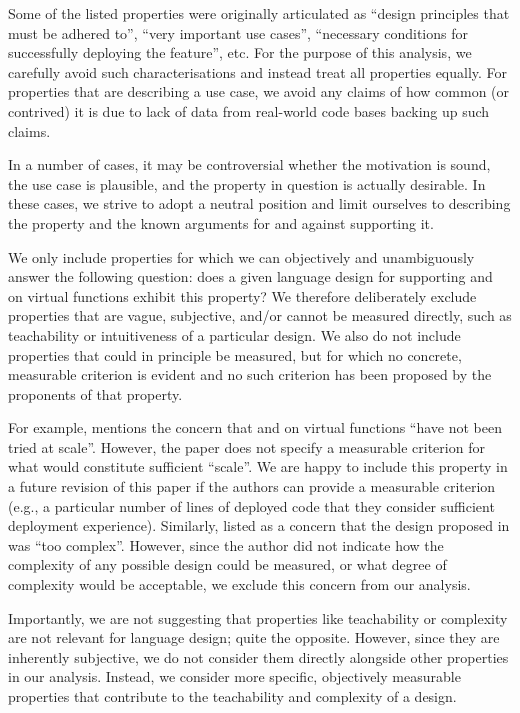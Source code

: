 Some of the listed properties were originally articulated as ``design principles that must be adhered to'',  ``very important use cases'', ``necessary conditions for successfully deploying the feature'', etc. For the purpose of this analysis, we carefully avoid such characterisations and instead treat all properties equally. For properties that are describing a use case, we avoid any claims of how common (or contrived) it is due to lack of data from real-world code bases backing up such claims.

In a number of cases, it may be controversial whether the motivation is sound, the use case is plausible, and the property in question is actually desirable. In these cases, we strive to adopt a neutral position and limit ourselves to describing the property and the known arguments for and against supporting it.

We only include properties for which we can objectively and unambiguously answer the following question: does a given language design for supporting  and  on virtual functions exhibit this property? We therefore deliberately exclude properties that are vague, subjective, and/or cannot be measured directly, such as teachability or intuitiveness of a particular design. We also do not include properties that could in principle be measured, but for which no concrete, measurable criterion is evident and no such criterion has been proposed by the proponents of that property.

For example, \cite{P3573R0} mentions the concern that  and  on virtual functions ``have not been tried at scale''. However, the paper does not specify a measurable criterion for what would constitute sufficient ``scale''. We are happy to include this property in a future revision of this paper if the authors can provide a measurable criterion (e.g., a particular number of lines of deployed code that they consider sufficient deployment experience). Similarly, \cite{P3506R0} listed as a concern that the design proposed in \cite{P3097R0} was ``too complex''. However, since the author did not indicate how the complexity of any possible design could be measured, or what degree of complexity would be acceptable, we exclude this concern from our analysis.

Importantly, we are not suggesting that properties like teachability or complexity are not relevant for language design; quite the opposite. However, since they are inherently subjective, we do not consider them directly alongside other properties in our analysis. Instead, we consider more specific, objectively measurable properties that contribute to the teachability and complexity of a design.

